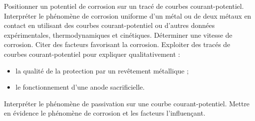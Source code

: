 \begin{competences}
    \point Positionner un potentiel de corrosion sur un tracé de courbes courant-potentiel.
    \point Interpréter le phénomène de corrosion uniforme d’un métal ou de deux métaux en contact en utilisant des courbes courant-potentiel ou d’autres données expérimentales, thermodynamiques et cinétiques.
    \point Déterminer une vitesse de corrosion.
    \point Citer des facteurs favorisant la corrosion.
    \point Exploiter des tracés de courbes courant-potentiel pour expliquer qualitativement :
    \begin{itemize}
        \item la qualité de la protection par un revêtement métallique ;
        \item le fonctionnement d’une anode sacrificielle.
    \end{itemize}
    \point Interpréter le phénomène de passivation sur une courbe courant-potentiel.
    \point \faSignLanguage Mettre en évidence le phénomène de corrosion et les facteurs l’influençant.
\end{competences}